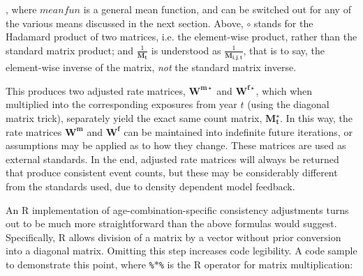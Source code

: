 \documentclass[reqno,12pt,oneside,a4paper]{report} %
\theoremstyle{plain}
\theoremstyle{definition}
\theoremstyle{remark}
\numberwithin{theorem}{chapter}     %
\begin{document}
\noindent, where $meanfun$ is a general mean function, and can be switched out for any of the various means discussed in the next section. Above, $\circ$ stands for the Hadamard product of two matrices, i.e. the element-wise product, rather than the standard matrix product; and $\frac{1}{\bm{M_{t}}}$ is understood as $\frac{1}{\bm{M_{i,j,t}}}$, that is to say, the element-wise inverse of the matrix, \textit{not} the standard matrix inverse.

This produces two adjusted rate matrices, $\bm{W^{m\star}}$ and $\bm{W^{f\star}}$, which when multiplied into the corresponding exposures from year $t$ (using the diagonal matrix trick), separately yield the exact same count matrix, $\bm{M_{t}^{\star}}$. In this way, the rate matrices $\bm{W^m}$ and $\bm{W^f}$ can be maintained into indefinite future iterations, or assumptions may be applied as to how they change. These matrices are used as external standards. In the end, adjusted rate matrices will always be returned that produce consistent event counts, but these may be considerably different from the standards used, due to density dependent model feedback.

An R implementation of age-combination-specific consistency adjustments turns out to be much more straightforward than the above formulas would suggest. Specifically, R allows division of a matrix by a vector without prior conversion into a diagonal matrix. Omitting this step increases code legibility. A code sample to demonstrate this point, where \texttt{\%$\ast$\%} is the R operator for matrix multiplication:
\end{document}
